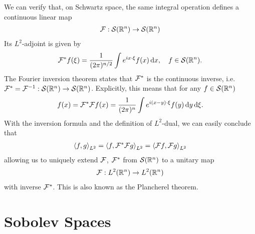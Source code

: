 \documentclass[12pt]{article}
\begin{document}
We can verify that, on Schwartz space, the same integral operation defines a continuous linear map 
\begin{align*}
\F : \sch(\R^n) \to \sch(\R^n)
\end{align*}
Its $L^2$-adjoint is given by 
\begin{align*}
\F^* f(\xi) = \frac{1}{(2\pi)^{n/2}} \int e^{i x \cdot \xi} f(x)\d[x], \quad f \in \sch(\R^n). 
\end{align*}
The Fourier inversion theorem states that $\F^* $ is the continuous inverse, i.e. $\F^* = \F^{-1} : \sch(\R^n) \to \sch(\R^n)$. Explicitly, this means that for any $f \in \sch(\R^n)$ 
\begin{align*}
f(x) = \F^* \F f (x) = \frac{1}{(2\pi)^n} \int e^{i(x - y) \cdot \xi} f(y) \d[y] \d[\xi]. 
\end{align*}
With the inversion formula and the definition of $L^2$-dual, we can easily conclude that 
\begin{align*}
\inprod[f, g]_{L^2} = \inprod[f, \F^* \F g]_{L^2} = \inprod[\F f, \F g]_{L^2}
\end{align*}
allowing us to uniquely extend $\F$, $\F^*$ from $\sch(\R^n)$ to a unitary map 
\begin{align*}
\F : L^2(\R^n) \to L^2(\R^n)
\end{align*}
with inverse $\F^*$. This is also known as the Plancherel theorem. 



\section{Sobolev Spaces }
\cite[Chapter 4]{taylor_pde}
\end{document}
